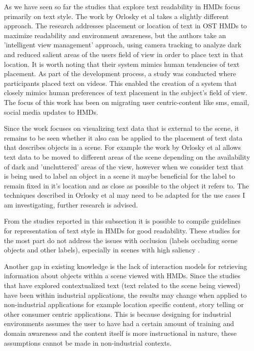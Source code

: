 \documentclass{article}
\begin{document}
As we have seen so far the studies that explore text readability in HMDs focus primarily on text style. The work by Orlosky et al \cite{6671805,Orlosky:2013:DTM:2449396.2449443,Orlosky:2014:MMT:2636242.2636246} takes a slightly different approach. The research addresses placement or location of text in OST HMDs to maximize readability and environment awareness, but the authors take an 'intelligent view management' approach, using camera tracking to analyze dark and reduced salient areas of the users field of view in order to place text in that location. It is worth noting that their system mimics human tendencies of text placement. As part of the development process, a study was conducted where participants placed text on videos. This enabled the creation of a system that closely mimics human preferences of text placement in the subject's field of view. The focus of this work has been on migrating user centric-content like sms, email, social media updates to HMDs. 

Since the work focuses on visualizing text data that is external to the scene, it remains to be seen whether it also can be applied to the placement of text data that describes objects in a scene. For example the work by Orlosky et al allows text data to be moved to different areas of the scene depending on the availability of dark and 'uncluttered' areas of the view, however when we consider text that is being  used to label an object in a scene it maybe beneficial for the label to remain fixed in it's location and as close as possible to the object it refers to. The techniques described in Orlosky et al \cite{Orlosky:2014:MMT:2636242.2636246}  may need to be adapted for the use cases I am investigating, further research is advised.

From the studies reported in this subsection it is possible to compile guidelines for representation of text style in HMDs for good readability. These studies for the most part do not address the issues with occlusion (labels occluding scene objects and  other labels), especially in scenes with high saliency \cite{Grasset6402555}. 

Another gap in existing knowledge is the lack of interaction models for retrieving information about objects within a scene viewed with HMDs. Since the studies that have explored contextualized text (text related to the scene being viewed) have been within industrial applications, the results may change when applied to non-industrial applications for example location specific content, story telling or other consumer centric applications. This is because designing for industrial environments assumes the user to have had a certain amount of training and domain awareness and the content itself is more instructional in nature, these assumptions cannot be made in non-industrial contexts. 
\end{document}
